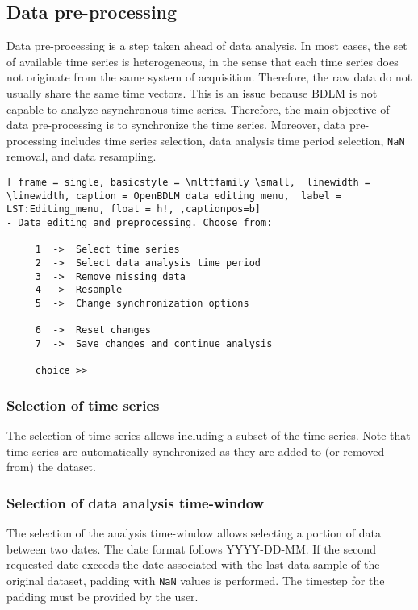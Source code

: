 \subsection{Data pre-processing}
\label{S:DATAEDITINGPREPROCESSING}

Data pre-processing is a step taken ahead of data analysis.
In most cases, the set of available time series is heterogeneous, in the sense that each time series does not originate from the same system of acquisition.
Therefore, the raw data do not usually share the same time vectors.
This is an issue because BDLM is not capable to analyze asynchronous time series.
Therefore, the main objective of data pre-processing is to synchronize the time series. 
Moreover, data pre-processing includes time series selection, data analysis time period selection, \lstinline[basicstyle = \mlttfamily \small ]!NaN! removal, and data resampling.

\begin{lstlisting}[ frame = single, basicstyle = \mlttfamily \small,  linewidth = \linewidth, caption = OpenBDLM data editing menu,  label = LST:Editing_menu, float = h!, ,captionpos=b]
- Data editing and preprocessing. Choose from:

     1  ->  Select time series
     2  ->  Select data analysis time period 
     3  ->  Remove missing data
     4  ->  Resample
     5  ->  Change synchronization options

     6  ->  Reset changes
     7  ->  Save changes and continue analysis

     choice >> 
\end{lstlisting}    

\subsubsection{Selection of time series}
\label{SS:SelectionTimeSeries}

The selection of time series allows including a subset of the time series. Note that time series are automatically synchronized as they are added to (or removed from) the dataset.

\subsubsection{Selection of data analysis time-window}
\label{SS:SelectionPeriodAnalysis}

The selection of the analysis time-window allows selecting a portion of data between two dates.
The date format follows \textquotesingle YYYY-DD-MM\textquotesingle {}.
If the second requested date exceeds the date associated with the last data sample of the original dataset, padding with \lstinline[basicstyle = \mlttfamily \small ]!NaN! values is performed. 
The timestep for the padding must be provided by the user.

